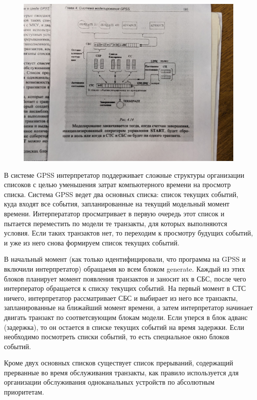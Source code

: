 \documentclass[14pt]{extarticle}
\begin{document}
\begin{figure}[h!]
    \centering
    \includegraphics[scale=0.2]{gpss.jpg}
\end{figure}

\newpage

В системе GPSS интерпретатор поддерживает сложные структуры организации списоков с целью уменьшения затрат компьютерного времени на просмотр списка. Система GPSS ведет два основных списка: список текущих событий, куда входят все события, запланированные на текущий модельный момент времени. Интерперататор просматривает в первую очередь этот список и пытается переместить по модели те транзакты, для которых выполняются условия. Если таких транзактов нет, то переходим к просмотру будущих событий, и уже из него снова формируем список текущих событий. 

В начальный момент (как только идентифицировали, что программа на GPSS и включили интерпретатор) обращаемя ко всем блоком generate. Каждый из этих блоков планирует момент появления транзактов и заносит их в СБС, после чего интерператор обращается к списку текущих событий. На первый момент в СТС ничего, интерпретатор рассматривает СБС и выбирает из него все транзакты, запланированные на ближайший момент времени, а затем интерпретатор начинает двигать транзакт по соответсвующим блокам модели. Если уперся в блок адванс (задержка), то он остается в списке текущих событий на время задержки. Если необходимо посмотреть списки событий, то есть специальное окно блоков событий.  

Кроме двух основных списков существует список прерываний, содержащий прерванные во время обслуживания транзакты, как правило используется для организации обслуживания одноканальных устройств по абсолютным приоритетам. 
\end{document}
